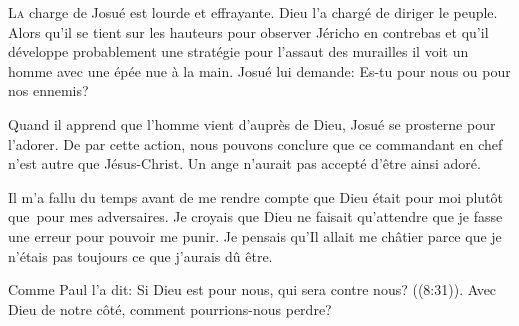 



\lettrine{L}{a} charge de Josué est lourde et effrayante.
 Dieu l'a chargé de diriger le peuple.
 Alors qu'il se tient sur les hauteurs pour observer Jéricho en contrebas
 \ocadr et qu'il développe probablement une stratégie
 pour l'assaut des murailles \fcadr{}
 il voit un homme avec une épée nue à la main.
 Josué lui demande: \Og Es-tu pour nous ou pour nos ennemis? \Fg{}

Quand il apprend que l'homme vient d'auprès de Dieu,
 Josué se prosterne pour l'adorer.
 De par cette action, nous pouvons conclure que ce commandant en chef
 n'est autre que Jésus-Christ. Un ange n'aurait pas accepté d'être ainsi adoré.

Il m'a fallu du temps avant de me rendre compte que Dieu
 était pour moi plutôt que~pour mes adversaires.
 Je croyais que Dieu ne faisait qu'attendre
 que je fasse une erreur pour pouvoir me punir.
 Je pensais qu'Il allait me châtier
 parce que je n'étais pas toujours ce que j'aurais dû être.


Comme Paul l'a dit:
 \Og Si Dieu est pour nous, qui sera contre nous? \Fg{} ((8:31)).
 Avec Dieu de notre côté, comment pourrions-nous perdre? 

\dvrule




